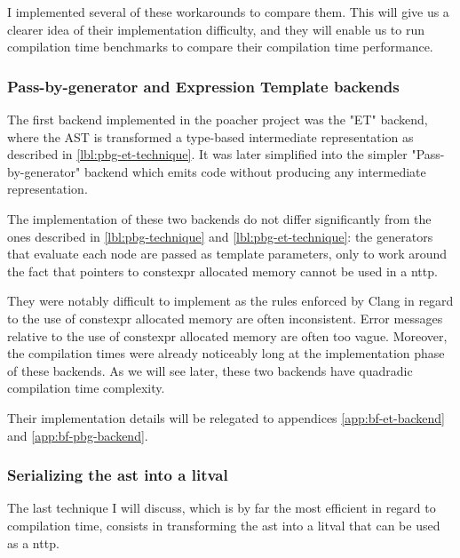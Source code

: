 \documentclass[../main]{subfiles}
\begin{document}
I implemented several of these workarounds to compare them.
This will give us a clearer idea of their implementation difficulty,
and they will enable us to run compilation time benchmarks to compare their
compilation time performance.

\subsubsection{Pass-by-generator and Expression Template backends}

The first backend implemented in the poacher project was the "ET" backend,
where the AST is transformed a type-based intermediate representation
as described in \ref{lbl:pbg-et-technique}. It was later simplified into
the simpler "Pass-by-generator" backend which emits code without producing
any intermediate representation.

The implementation of these two backends do not differ significantly from
the ones described in \ref{lbl:pbg-technique} and \ref{lbl:pbg-et-technique}:
the generators that evaluate each node are passed as template parameters,
only to work around the fact that pointers to \gls{constexpr} allocated memory
cannot be used in a \gls{nttp}.

They were notably difficult to implement as the rules enforced by Clang
in regard to the use of \gls{constexpr} allocated memory are often inconsistent.
Error messages relative to the use of \gls{constexpr} allocated memory are often
too vague. Moreover, the compilation times were already noticeably long
at the implementation phase of these backends. As we will see later,
these two backends have quadradic compilation time complexity.

Their implementation details will be relegated
to appendices \ref{app:bf-et-backend} and \ref{app:bf-pbg-backend}.


\subsubsection{Serializing the \gls{ast} into a \gls{litval}}

The last technique I will discuss, which is by far the most efficient
in regard to compilation time, consists in transforming the \gls{ast} into a
\gls{litval} that can be used as a \gls{nttp}.
\end{document}

